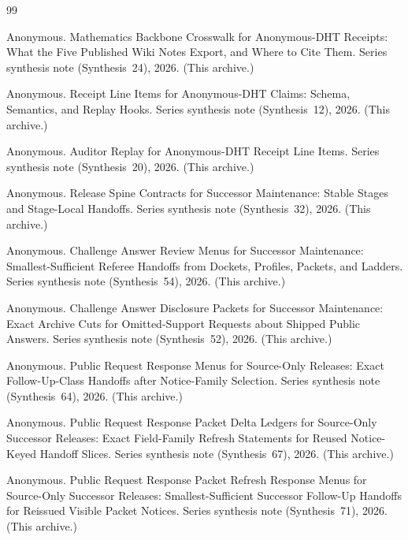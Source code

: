 \documentclass[11pt]{article}
\begin{document}
\begin{thebibliography}{99}\small

Anonymous.
\newblock Mathematics Backbone Crosswalk for Anonymous-DHT Receipts: What the Five Published Wiki Notes Export, and Where to Cite Them.
\newblock Series synthesis note (Synthesis~24), 2026. (This archive.)

Anonymous.
\newblock Receipt Line Items for Anonymous-DHT Claims: Schema, Semantics, and Replay Hooks.
\newblock Series synthesis note (Synthesis~12), 2026. (This archive.)

Anonymous.
\newblock Auditor Replay for Anonymous-DHT Receipt Line Items.
\newblock Series synthesis note (Synthesis~20), 2026. (This archive.)

Anonymous.
\newblock Release Spine Contracts for Successor Maintenance: Stable Stages and Stage-Local Handoffs.
\newblock Series synthesis note (Synthesis~32), 2026. (This archive.)

Anonymous.
\newblock Challenge Answer Review Menus for Successor Maintenance: Smallest-Sufficient Referee Handoffs from Dockets, Profiles, Packets, and Ladders.
\newblock Series synthesis note (Synthesis~54), 2026. (This archive.)

Anonymous.
\newblock Challenge Answer Disclosure Packets for Successor Maintenance: Exact Archive Cuts for Omitted-Support Requests about Shipped Public Answers.
\newblock Series synthesis note (Synthesis~52), 2026. (This archive.)

Anonymous.
\newblock Public Request Response Menus for Source-Only Releases: Exact Follow-Up-Class Handoffs after Notice-Family Selection.
\newblock Series synthesis note (Synthesis~64), 2026. (This archive.)

Anonymous.
\newblock Public Request Response Packet Delta Ledgers for Source-Only Successor Releases: Exact Field-Family Refresh Statements for Reused Notice-Keyed Handoff Slices.
\newblock Series synthesis note (Synthesis~67), 2026. (This archive.)

Anonymous.
\newblock Public Request Response Packet Refresh Response Menus for Source-Only Successor Releases: Smallest-Sufficient Successor Follow-Up Handoffs for Reissued Visible Packet Notices.
\newblock Series synthesis note (Synthesis~71), 2026. (This archive.)


\end{thebibliography}
\end{document}
